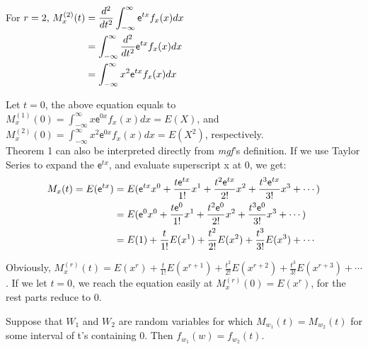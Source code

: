 \documentclass[12pt]{article}
\begin{document}
For $r=2 \text{,  } 
\begin{aligned}[t]
M_x^{(2)} (t)  
    &= \frac{d^2}{dt^2} \int_{-\infty}^{\infty}  \mathsf{e}^{tx}f_x (x)dx\\
    &=\int_{-\infty}^{\infty} \frac{d^2}{dt^2}  \mathsf{e}^{tx}f_x (x)dx\\
    &=\int_{-\infty}^{\infty} x^2  \mathsf{e}^{tx}f_x (x)dx\\
    \end{aligned}\\
$

Let $t=0$,  the above equation equals to $M_x ^{(1)} (0)= {\displaystyle \int_{-\infty}^{\infty} x  \mathsf{e}^{0x}f_x (x)dx} = E (X)$,  and $M_x ^{(2)} (0)= {\displaystyle \int_{-\infty}^{\infty} x^2  \mathsf{e}^{0x}f_x (x)dx} = E(X^2)$,  respectively.
\\

Theorem 1 can also be interpreted directly from  \textit{mgf}'s definition.  If we use Taylor Series to expand the $ \mathsf{e}^{tx}$,  and evaluate superscript x at 0, we get:
$$
\begin{aligned}[t]
M_x (t) = E(\mathsf{e}^{tx})
	&= E( \mathsf{e}^{tx}x^0 + \frac{t \mathsf{e}^{tx}}{1!} x^1 + \frac{t^2 \mathsf{e}^{tx}}{2!} x^2 + \frac{t^3 \mathsf{e}^{tx}}{3!} x^3 + \cdots )\\
	&= E( \mathsf{e}^{0}x^0 + \frac{t \mathsf{e}^{0}}{1!} x^1 + \frac{t^2 \mathsf{e}^{0}}{2!} x^2 + \frac{t^3 \mathsf{e}^{0}}{3!} x^3 + \cdots )\\
	&= E(1) + \frac{t}{1!} E(x^1) + \frac{t^2} {2!} E( x^2) + \frac{t^3}{3!} E( x^3) + \cdots \\
\end{aligned}\\
$$ 

Obviously,  $M_x ^{(r)} (t) = E (x^r) + {\displaystyle \frac{t}{1!} E(x^{r+1}) } +{\displaystyle \frac{t^2} {2!} E( x^{r+2}) } + {\displaystyle \frac{t^3}{3!} E( x^{r+3}) } + \cdots $.  If we let $t=0$,  we reach the equation easily at $M_x ^{(r)} (0) = E (x^r) $,  for the rest parts reduce to $0$. \\


\begin{tcolorbox} [colback=blue!5!white,  colframe=blue!75!black,  title= {\textbf{Theorem 2} }]

\hspace{10pt} Suppose that $W_1$ and $W_2$ are random variables for which $M_{w_1} (t) = M_{w_2} (t)$ for some interval of t's containing 0. Then $f_{w_1} (w) = f_{w_2} (t)$. 

\end{tcolorbox}
\end{document}
